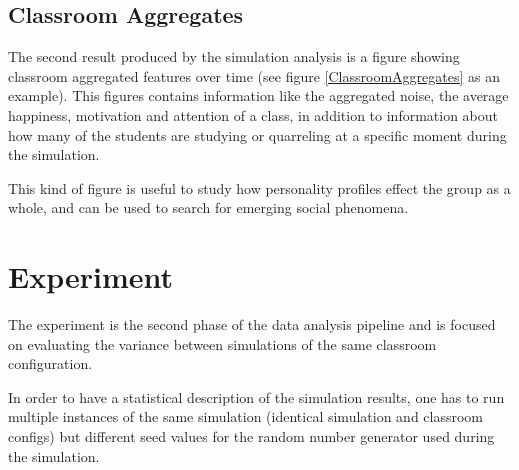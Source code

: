 \subsection{Classroom Aggregates}
The second result produced by the simulation analysis is a figure showing classroom
aggregated features over time (see figure \ref{ClassroomAggregates} as an example).
This figures contains information like the aggregated noise, the average happiness,
motivation and attention of a class, in addition to information about how many of
the students are studying or quarreling at a specific moment during the simulation.

This kind of figure is useful to study how personality profiles effect the group
as a whole, and can be used to search for emerging social phenomena.

\begin{figure}[H]
\end{figure}



\section{Experiment}
The experiment is the second phase of the data analysis pipeline and is focused
on evaluating the variance between simulations of the same classroom configuration.

\begin{figure}[H]
\end{figure}

In order to have a statistical description of the simulation results, one has to
run multiple instances of the same simulation (identical simulation  and classroom
configs) but different seed values for the random number generator used during the simulation.

